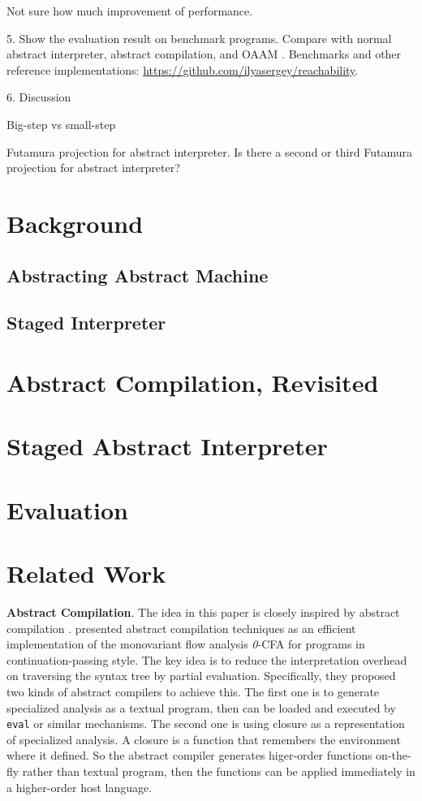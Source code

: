 \documentclass[acmsmall,review,anonymous]{acmart}\settopmatter{printfolios=true,printccs=false,printacmref=false}
\begin{document}
Not sure how much improvement of performance.

5. Show the evaluation result on benchmark programs. 
Compare with normal abstract interpreter, 
abstract compilation\cite{Boucher:1996:ACN:647473.727587}, and OAAM \cite{Johnson:2013:OAA:2500365.2500604}.
Benchmarks and other reference implementations: \url{https://github.com/ilyasergey/reachability}.

6. Discussion

Big-step vs small-step

Futamura projection for abstract interpreter. Is there a second or third Futamura projection for
abstract interpreter?

\section{Background}

\subsection{Abstracting Abstract Machine}

\subsection{Staged Interpreter}

\section{Abstract Compilation, Revisited}

\section{Staged Abstract Interpreter}

\section{Evaluation}

\section{Related Work}

\textbf{Abstract Compilation}. The idea in this paper is closely inspired by 
abstract compilation \cite{Boucher:1996:ACN:647473.727587}.
\citeauthor{Boucher:1996:ACN:647473.727587} presented abstract compilation
techniques as an efficient implementation of the monovariant flow analysis 
\textit{0}-CFA for programs in continuation-passing style. The key idea is to 
reduce the interpretation overhead on traversing the syntax tree by partial evaluation.
Specifically, they proposed two kinds of abstract compilers to achieve this. 
The first one is to generate specialized analysis as a textual program, then 
can be loaded and executed by \texttt{eval} or similar mechanisms. The second 
one is using closure as a representation of specialized analysis. 
A closure is a function that remembers the environment where it defined. So the 
abstract compiler generates higer-order functions on-the-fly rather than textual 
program, then the functions can be applied immediately in a higher-order host language.
\end{document}
